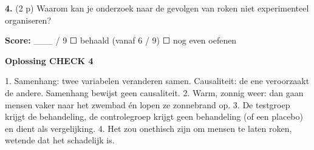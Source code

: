 \textbf{4.} (2 p) Waarom kan je onderzoek naar de gevolgen van roken niet experimenteel organiseren? \lijn

\begin{doel}
\textbf{Score:} \_\_\_ / 9 \quad ☐ behaald (vanaf 6 / 9) \quad ☐ nog even oefenen
\end{doel}

\begin{oplossing}
\textbf{Oplossing CHECK 4}

1. Samenhang: twee variabelen veranderen samen. Causaliteit: de ene veroorzaakt de andere. Samenhang bewijst geen causaliteit. 2. Warm, zonnig weer: dan gaan mensen vaker naar het zwembad én lopen ze zonnebrand op. 3. De testgroep krijgt de behandeling, de controlegroep krijgt geen behandeling (of een placebo) en dient als vergelijking. 4. Het zou onethisch zijn om mensen te laten roken, wetende dat het schadelijk is.
\end{oplossing}

